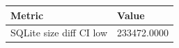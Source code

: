 \begin{tabular}{ll}
\hline
Metric & Value \\
\hline
SQLite size diff CI low & 233472.0000 \\
\hline
\end{tabular}
